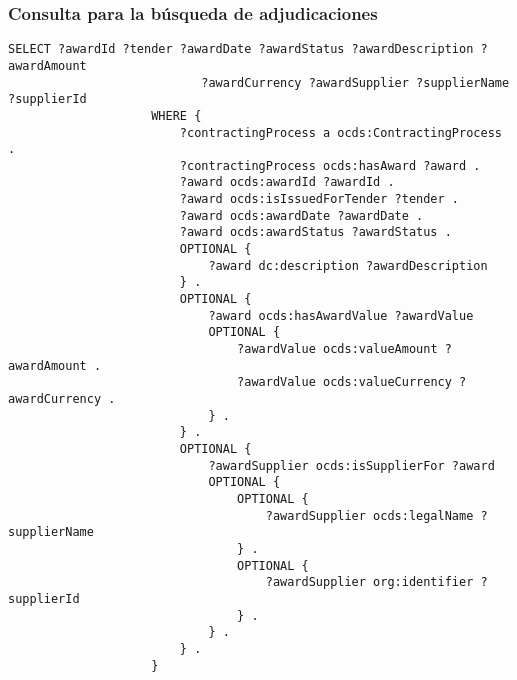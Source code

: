         \subsubsection{Consulta para la búsqueda de adjudicaciones}
            \begin{minipage}{\linewidth}
                \begin{lstlisting}[language=lSPARQL]
                    SELECT ?awardId ?tender ?awardDate ?awardStatus ?awardDescription ?awardAmount
                           ?awardCurrency ?awardSupplier ?supplierName ?supplierId
                    WHERE {
                        ?contractingProcess a ocds:ContractingProcess .
                        ?contractingProcess ocds:hasAward ?award .
                        ?award ocds:awardId ?awardId .
                        ?award ocds:isIssuedForTender ?tender .
                        ?award ocds:awardDate ?awardDate .
                        ?award ocds:awardStatus ?awardStatus .
                        OPTIONAL {
                            ?award dc:description ?awardDescription
                        } .
                        OPTIONAL {
                            ?award ocds:hasAwardValue ?awardValue
                            OPTIONAL {
                                ?awardValue ocds:valueAmount ?awardAmount .
                                ?awardValue ocds:valueCurrency ?awardCurrency .
                            } .
                        } .
                        OPTIONAL {
                            ?awardSupplier ocds:isSupplierFor ?award
                            OPTIONAL {
                                OPTIONAL {
                                    ?awardSupplier ocds:legalName ?supplierName
                                } .
                                OPTIONAL {
                                    ?awardSupplier org:identifier ?supplierId
                                } .
                            } .
                        } .
                    }
                \end{lstlisting}
            \end{minipage}


